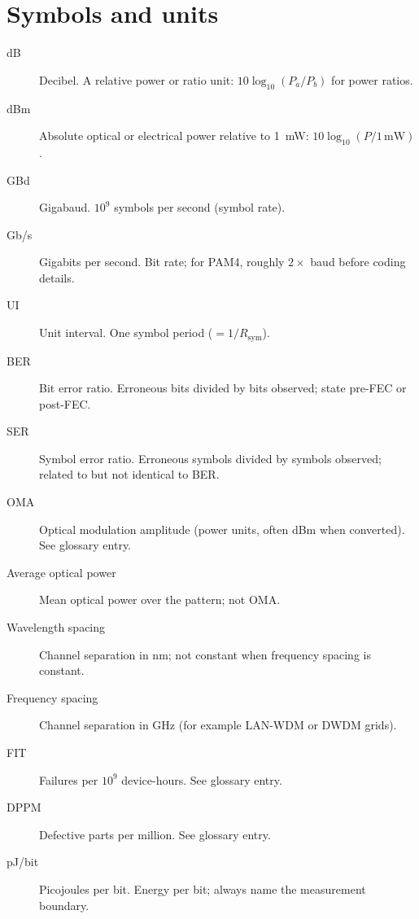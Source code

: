 \section{Symbols and units}
\label{sec:glossary-symbols}
\begin{description}
\item[dB] Decibel. A relative power or ratio unit: $10\log_{10}(P_a/P_b)$ for power ratios.
\item[dBm] Absolute optical or electrical power relative to 1~mW: $10\log_{10}(P/1\,\mathrm{mW})$.
\item[GBd] Gigabaud. $10^9$ symbols per second (symbol rate).
\item[Gb/s] Gigabits per second. Bit rate; for PAM4, roughly $2\times$ baud before coding details.
\item[UI] Unit interval. One symbol period ($=1/R_\mathrm{sym}$).
\item[BER] Bit error ratio. Erroneous bits divided by bits observed; state pre-FEC or post-FEC.
\item[SER] Symbol error ratio. Erroneous symbols divided by symbols observed; related to but not identical to BER.
\item[OMA] Optical modulation amplitude (power units, often dBm when converted). See glossary entry.
\item[Average optical power] Mean optical power over the pattern; not OMA.
\item[Wavelength spacing] Channel separation in nm; not constant when frequency spacing is constant.
\item[Frequency spacing] Channel separation in GHz (for example LAN-WDM or DWDM grids).
\item[FIT] Failures per $10^9$ device-hours. See glossary entry.
\item[DPPM] Defective parts per million. See glossary entry.
\item[pJ/bit] Picojoules per bit. Energy per bit; always name the measurement boundary.
\end{description}

